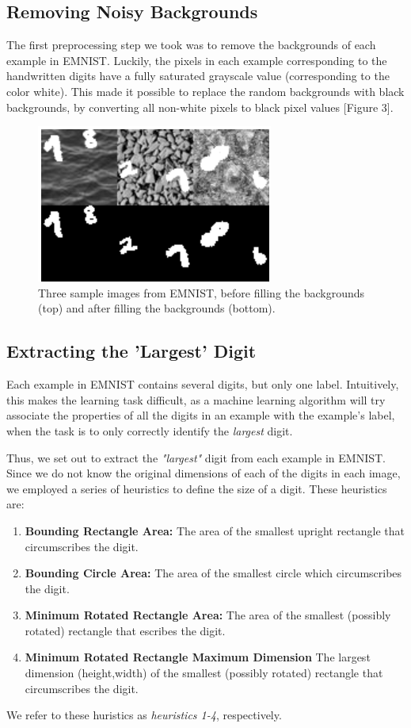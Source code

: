 \documentclass[letterpaper, 10 pt, conference]{ieeeconf}  %
\begin{document}
\subsection{Removing Noisy Backgrounds} 

The first preprocessing step we took was to remove the backgrounds of each example in EMNIST. Luckily, the pixels in each example corresponding to the handwritten digits have a fully saturated grayscale value (corresponding to the color white). This made it possible to replace the random backgrounds with black backgrounds, by converting all non-white pixels to black pixel values [Figure 3].
\begin{figure}[H]
      \centering
      \includegraphics[scale = 1]{blackout}
		\centering
      \caption{Three sample images from EMNIST, before filling the backgrounds (top) and after filling the backgrounds (bottom).}
      \label{figurelabel}
   \end{figure}

\subsection{Extracting the 'Largest' Digit} 

Each example in EMNIST contains several digits, but only one label. Intuitively, this makes the learning task difficult, as a machine learning algorithm will try associate the properties of all the  digits in an example with the example's label, when the task is to only correctly identify the \emph{largest} digit. 

Thus, we set out to extract the \emph{"largest"} digit from each example in EMNIST. Since we do not know the original dimensions of each of the digits in each image, we employed a series of heuristics to define the size of a digit. These heuristics are:
\begin{enumerate}
\item \textbf{Bounding Rectangle Area:} The area of the smallest upright rectangle that circumscribes the digit. 
\item \textbf{Bounding Circle Area:} The area of the smallest circle which circumscribes the digit. 
\item \textbf{Minimum Rotated Rectangle Area:} The area of the smallest (possibly rotated) rectangle that escribes the digit.
\item \textbf{Minimum Rotated Rectangle Maximum Dimension} The largest dimension (height,width) of the smallest (possibly rotated) rectangle that circumscribes the digit. 
\end{enumerate}
We refer to these huristics as \emph{heuristics 1-4}, respectively.
\end{document}
